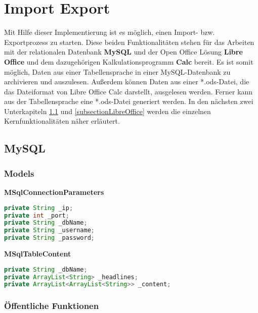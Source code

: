 \section{Import Export}
\label{sectionImportExport}

Mit Hilfe dieser Implementierung ist es möglich, einen Import- bzw. Exportprozess zu starten. Diese beiden Funktionalitäten stehen für das Arbeiten mit der relationalen Datenbank \textbf{MySQL} und der Open Office Lösung \textbf{Libre Office} und dem dazugehörigen Kalkulationsprogramm \textbf{Calc} bereit. Es ist somit möglich, Daten aus einer Tabellensprache in einer MySQL-Datenbank zu archivieren und auszulesen. Außerdem können Daten aus einer *.ods-Datei, die das Dateiformat von Libre Office Calc darstellt, ausgelesen werden. Ferner kann aus der Tabellensprache eine *.ods-Datei generiert werden. In den nächsten zwei Unterkapiteln \ref{subsectionMySql} und \ref{subsectionLibreOffice} werden die einzelnen Kernfunktionalitäten näher erläutert.

\subsection{MySQL}
\label{subsectionMySql}

\subsubsection{Models}
\label{subsubsectionMySqlModels}
\textbf{MSqlConnectionParameters}

\begin{lstlisting}[label={labelMySqlConnectionParameters},caption=Parameter für eine MySQL-Datenbankverbindung, language=Java]
private String _ip;
private int _port;
private String _dbName;
private String _username;
private String _password;
\end{lstlisting}

\textbf{MSqlTableContent}

\begin{lstlisting}[label={labelMySqlConnectionParameters},caption=Repräsentation einer MySQL-Tabelle als Java-Objekt, language=Java]
private String _dbName;
private ArrayList<String> _headlines;
private ArrayList<ArrayList<String>> _content;
\end{lstlisting}

\subsubsection{Öffentliche Funktionen}
\label{subsubsectionMySqlPublicFunctions}


